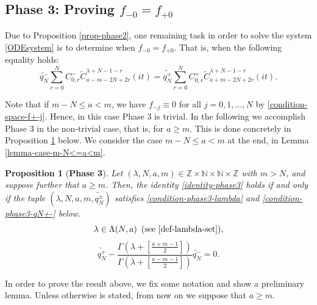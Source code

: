 \documentclass[12pt, pdflatex, a4paper]{article}
\theoremstyle{plain}
\newtheorem{prop}[thm]{Proposition}
\theoremstyle{definition}
\def\Geg{\widetilde{C}}
\def\N{{\mathbb N}}
\def\Z{{\mathbb Z}}
\begin{document}
\subsection{Phase 3: Proving $f_{-0} = f_{+0}$}\label{section-phase3}
Due to Proposition \ref{prop-phase2}, one remaining task in order to solve the system \eqref{ODEsystem} is to determine when $f_{-0} = f_{+0}$. That is, when the following equality holds:
\begin{equation}\label{identity-phase3}
\widetilde{q_N^-}\sum_{r=0}^{N}C_{0,r}^-\Geg_{a-m-2N+2r}^{\lambda+N-1-r}(it) = \widetilde{q_N^+}\sum_{r=0}^{N}C_{0,r}^+\Geg_{a+m-2N+2r}^{\lambda+N-1-r}(it).
\end{equation}

Note that if $m-N \leq a < m$, we have $f_{-j} \equiv 0$ for all $j = 0, 1, \ldots, N$ by \eqref{condition-space-f+-j}. Hence, in this case Phase 3 is trivial. In the following we accomplish Phase 3 in the non-trivial case, that is, for $a \geq m$. This is done concretely in Proposition \ref{prop-phase3} below.
We consider the case $m-N \leq a < m$ at the end, in Lemma \ref{lemma-case-m-N<=a<m}.

\begin{prop}[\textbf{Phase 3}]\label{prop-phase3} Let $(\lambda, N, a, m) \in \Z\times \N \times \N \times \Z$ with $m > N$, and suppose further that $a \geq m$. Then, the identity \eqref{identity-phase3} holds if and only if the tuple $(\lambda, N, a, m, \widetilde{q_N^\pm})$ satisfies \eqref{condition-phase3-lambda} and \eqref{condition-phase3-qN+-} below.
\begin{equation}\label{condition-phase3-lambda}
\lambda \in \Lambda(N,a) \enspace (\text{see \eqref{def-lambda-set}}),
\end{equation}
\begin{equation}\label{condition-phase3-qN+-}
\widetilde{q_N^+} - \frac{\Gamma\left(\lambda+\left[\frac{a+m-1}{2}\right]\right)}{\Gamma\left(\lambda+\left[\frac{a-m-1}{2}\right]\right)}\widetilde{q_N^-} = 0.
\end{equation}
\end{prop}
In order to prove the result above, we fix some notation and show a preliminary lemma. Unless otherwise is stated, from now on we suppose that $a \geq m$.
\end{document}
